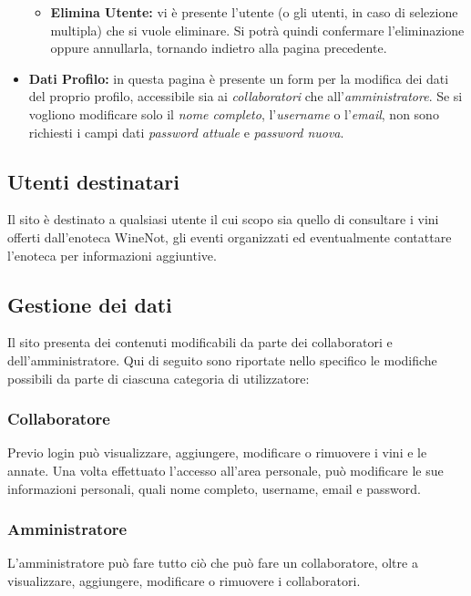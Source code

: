 \begin{itemize}
\begin{itemize}
			\item \textbf{Elimina Utente:} vi è presente l'utente (o gli utenti, in caso di selezione multipla) che si vuole eliminare. Si potrà quindi confermare l'eliminazione oppure annullarla, tornando indietro alla pagina precedente.
		\end{itemize}
	\item \textbf{Dati Profilo:} in questa pagina è presente un form per la modifica dei dati del proprio profilo, accessibile sia ai \textit{collaboratori} che all'\textit{amministratore}. Se si vogliono modificare solo il \textit{nome completo}, l'\textit{username} o l'\textit{email}, non sono richiesti i campi dati \textit{password attuale} e \textit{password nuova}.
\end{itemize}

\subsection{Utenti destinatari}

Il sito è destinato a qualsiasi utente il cui scopo sia quello di consultare
i vini offerti dall'enoteca WineNot, gli eventi organizzati ed eventualmente contattare l'enoteca per informazioni aggiuntive. 

\subsection{Gestione dei dati}

Il sito presenta dei contenuti modificabili da parte dei collaboratori e dell'amministratore. 
Qui di seguito sono riportate nello specifico le modifiche possibili da parte di ciascuna categoria di utilizzatore:

\subsubsection{Collaboratore}

Previo login può visualizzare, aggiungere, modificare o rimuovere i vini e le annate. 
Una volta effettuato l'accesso all'area personale, può modificare le sue
informazioni personali, quali nome completo, username, email e password.

\subsubsection{Amministratore}

L'amministratore può fare tutto ciò che può fare un collaboratore, oltre a 
visualizzare, aggiungere, modificare o rimuovere i collaboratori.



